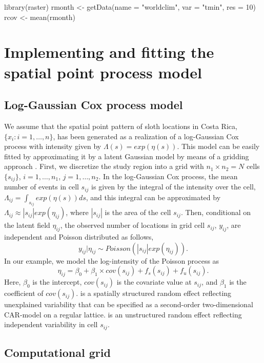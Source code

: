 \begin{example}
library(raster)
rmonth <- getData(name = "worldclim", var = "tmin", res = 10)
rcov <- mean(rmonth)
\end{example}



\section{Implementing and fitting the spatial point process model}

\subsection{Log-Gaussian Cox process model}


We assume that the spatial point pattern of sloth locations in Costa Rica, $\{x_i: i=1, \ldots, n\}$, has been generated as a realization of a  log-Gaussian Cox process with intensity given by $\Lambda(s)= exp(\eta(s))$.
This model can be easily fitted by approximating it by a latent Gaussian model by means of a gridding approach \citep{illianetal12}.
First, we discretize the study region into a grid with $n_1 \times n_2 = N$ cells $\{s_{ij}\}$, $i=1,\ldots,n_1$, $j=1,\ldots,n_2$.
In the log-Gaussian Cox process, the mean number of events in cell $s_{ij}$ is given by the integral of the intensity over the cell,
$\Lambda_{ij}=\int_{s_{ij}} exp(\eta(s))ds$, and
this integral can be approximated by
$\Lambda_{ij} \approx |s_{ij}| exp(\eta_{ij})$,
where $|s_{ij}|$ is the area of the cell $s_{ij}$.
Then, conditional on the latent field $\eta_{ij}$,
the observed number of locations in grid cell $s_{ij}$, 
$y_{ij}$, are independent and Poisson distributed as follows,
$$y_{ij}|\eta_{ij} \sim Poisson(|s_{ij}| exp(\eta_{ij})).$$
In our example, we model the log-intensity of the Poisson process as
$$\eta_{ij} = \beta_0 + \beta_1 \times cov(s_{ij}) + f_s(s_{ij}) + f_u(s_{ij}).$$
Here, $\beta_0$ is the intercept,
$cov(s_{ij})$ is the covariate value at $s_{ij}$, and
$\beta_1$ is the coefficient of $cov(s_{ij})$.
 is a spatially structured random effect reflecting unexplained variability that can be specified as a second-order two-dimensional CAR-model on a regular lattice.
 is an unstructured random effect reflecting independent variability in cell $s_{ij}$.


\subsection{Computational grid}

